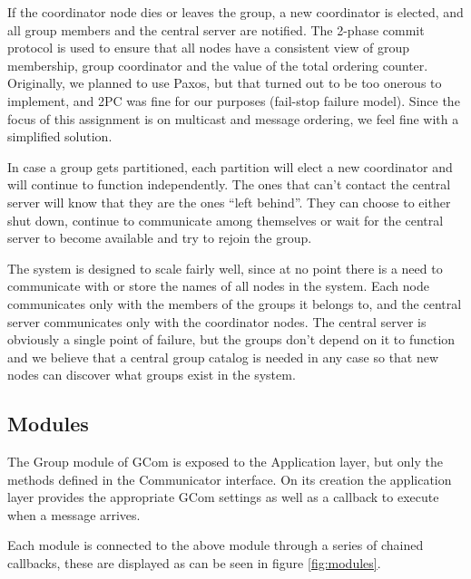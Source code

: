 \documentclass[10pt, oneside]{article}
\begin{document}
If the coordinator node dies or leaves the group, a new coordinator is elected,
and all group members and the central server are notified. The 2-phase commit
protocol is used to ensure that all nodes have a consistent view of group
membership, group coordinator and the value of the total ordering
counter. Originally, we planned to use Paxos, but that turned out to be too
onerous to implement, and 2PC was fine for our purposes (fail-stop failure
model). Since the focus of this assignment is on multicast and message ordering,
we feel fine with a simplified solution.

In case a group gets partitioned, each partition will elect a new coordinator
and will continue to function independently. The ones that can't contact the
central server will know that they are the ones ``left behind''. They can choose
to either shut down, continue to communicate among themselves or wait for the
central server to become available and try to rejoin the group.

The system is designed to scale fairly well, since at no point there is a need
to communicate with or store the names of all nodes in the system. Each node
communicates only with the members of the groups it belongs to, and the central
server communicates only with the coordinator nodes. The central server is
obviously a single point of failure, but the groups don't depend on it to
function and we believe that a central group catalog is needed in any case so
that new nodes can discover what groups exist in the system.
\pagebreak
\subsection{Modules}
The Group module of GCom is exposed to the Application layer, but only the 
methods defined in the Communicator interface. On its creation the application
layer provides the appropriate GCom settings as well as a callback to execute
when a message arrives. 

Each module is connected to the above module through a series of chained
callbacks, these are displayed as can be seen in figure \ref{fig:modules}.
\end{document}
